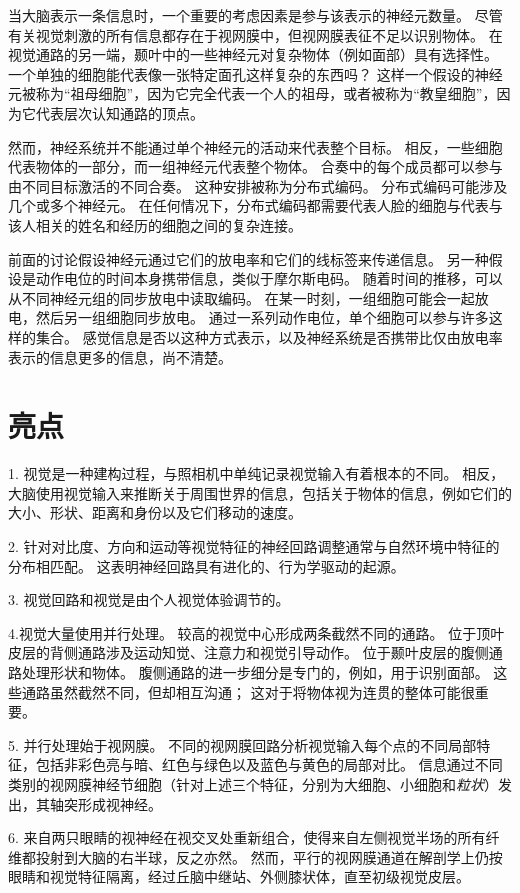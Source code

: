 当大脑表示一条信息时，一个重要的考虑因素是参与该表示的神经元数量。
尽管有关视觉刺激的所有信息都存在于视网膜中，但视网膜表征不足以识别物体。
在视觉通路的另一端，颞叶中的一些神经元对复杂物体（例如面部）具有选择性。
一个单独的细胞能代表像一张特定面孔这样复杂的东西吗？
这样一个假设的神经元被称为“祖母细胞”，因为它完全代表一个人的祖母，或者被称为“教皇细胞”，因为它代表层次认知通路的顶点。


然而，神经系统并不能通过单个神经元的活动来代表整个目标。
相反，一些细胞代表物体的一部分，而一组神经元代表整个物体。
合奏中的每个成员都可以参与由不同目标激活的不同合奏。
这种安排被称为分布式编码。
分布式编码可能涉及几个或多个神经元。
在任何情况下，分布式编码都需要代表人脸的细胞与代表与该人相关的姓名和经历的细胞之间的复杂连接。


前面的讨论假设神经元通过它们的放电率和它们的线标签来传递信息。
另一种假设是动作电位的时间本身携带信息，类似于摩尔斯电码。
随着时间的推移，可以从不同神经元组的同步放电中读取编码。
在某一时刻，一组细胞可能会一起放电，然后另一组细胞同步放电。
通过一系列动作电位，单个细胞可以参与许多这样的集合。
感觉信息是否以这种方式表示，以及神经系统是否携带比仅由放电率表示的信息更多的信息，尚不清楚。



\section{亮点}

1. 视觉是一种建构过程，与照相机中单纯记录视觉输入有着根本的不同。
相反，大脑使用视觉输入来推断关于周围世界的信息，包括关于物体的信息，例如它们的大小、形状、距离和身份以及它们移动的速度。


2. 针对对比度、方向和运动等视觉特征的神经回路调整通常与自然环境中特征的分布相匹配。
这表明神经回路具有进化的、行为学驱动的起源。


3. 视觉回路和视觉是由个人视觉体验调节的。


4.视觉大量使用并行处理。
较高的视觉中心形成两条截然不同的通路。
位于顶叶皮层的背侧通路涉及运动知觉、注意力和视觉引导动作。
位于颞叶皮层的腹侧通路处理形状和物体。
腹侧通路的进一步细分是专门的，例如，用于识别面部。 
这些通路虽然截然不同，但却相互沟通；
这对于将物体视为连贯的整体可能很重要。
 

5. 并行处理始于视网膜。
不同的视网膜回路分析视觉输入每个点的不同局部特征，包括非彩色亮与暗、红色与绿色以及蓝色与黄色的局部对比。
信息通过不同类别的视网膜神经节细胞（针对上述三个特征，分别为大细胞、小细胞和\textit{粒状}）发出，其轴突形成视神经。
 

6. 来自两只眼睛的视神经在视交叉处重新组合，使得来自左侧视觉半场的所有纤维都投射到大脑的右半球，反之亦然。
然而，平行的视网膜通道在解剖学上仍按眼睛和视觉特征隔离，经过丘脑中继站、外侧膝状体，直至初级视觉皮层。 


